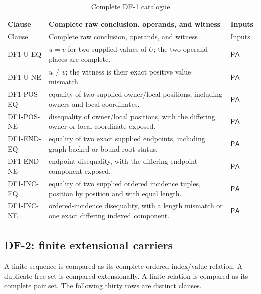 \documentclass[11pt,twoside]{article}
\begin{document}
\begin{longtable}{>{\raggedright\arraybackslash}p{}
                  >{\raggedright\arraybackslash}p{}
                  >{\raggedright\arraybackslash}p{}}
\caption{Complete DF-1 catalogue}\label{tab:df1}\\
\toprule
Clause & Complete raw conclusion, operands, and witness & Inputs\\
\midrule
\endfirsthead%
\toprule
Clause & Complete raw conclusion, operands, and witness & Inputs\\
\midrule
\endhead%
DF1-U-EQ & \(u=v\) for two supplied values of \(U\); the two operand places are
complete. & \(\mathsf{PA}\)\\
DF1-U-NE & \(u\ne v\); the witness is their exact positive value mismatch. &
\(\mathsf{PA}\)\\
DF1-POS-EQ & equality of two supplied owner/local positions, including owners and
local coordinates. & \(\mathsf{PA}\)\\
DF1-POS-NE & disequality of owner/local positions, with the differing owner or
local coordinate exposed. & \(\mathsf{PA}\)\\
DF1-END-EQ & equality of two exact supplied endpoints, including graph-backed or
bound-root status. & \(\mathsf{PA}\)\\
DF1-END-NE & endpoint disequality, with the differing endpoint component exposed.
& \(\mathsf{PA}\)\\
DF1-INC-EQ & equality of two supplied ordered incidence tuples, position by
position and with equal length. & \(\mathsf{PA}\)\\
DF1-INC-NE & ordered-incidence disequality, with a length mismatch or one exact
differing indexed component. & \(\mathsf{PA}\)\\
\bottomrule
\end{longtable}

\subsection{DF-2: finite extensional carriers}\label{sec:df2}

A finite sequence is compared as its complete ordered index/value relation.  A
duplicate-free set is compared extensionally.  A finite relation is compared as
its complete pair set.  The following thirty rows are distinct clauses.
\end{document}
